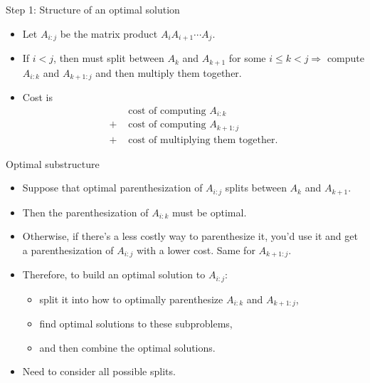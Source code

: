 \documentclass{beamer}
\begin{document}
\begin{frame}{Step 1: Structure of an optimal solution}
    \begin{itemize}
        \item Let $A_{i:j}$ be the matrix product $A_i A_{i+1} \cdots A_j$.
        \item If $i < j$, then must split between $A_k$ and $A_{k+1}$ for some $i \leq k < j \Rightarrow$  compute $A_{i:k}$ and $A_{k+1:j}$ and then multiply them together.
        \item Cost is
            \begin{equation*}
                \begin{align*}
                        & \text{ cost of computing } A_{i:k} \\
                    +   & \text{ cost of computing } A_{k+1:j} \\
                    +   & \text{ cost of multiplying them together.}
                \end{align*}
            \end{equation*}
    \end{itemize}
\end{frame}

\begin{frame}{Optimal substructure}
    \begin{itemize}
        \item Suppose that optimal parenthesization of $A_{i:j}$ splits between $A_k$ and $A_{k+1}$.
        \item Then the parenthesization of $A_{i:k}$ must be optimal.
        \item Otherwise, if there's a less costly way to parenthesize it, you'd use it and get a parenthesization of $A_{i:j}$ with a lower cost. Same for $A_{k+1:j}$.
        \item Therefore, to build an optimal solution to $A_{i:j}$:
            \begin{itemize}
                \item split it into how to optimally parenthesize $A_{i:k}$ and $A_{k+1:j}$,
                \item find optimal solutions to these subproblems,
                \item and then combine the optimal solutions.
            \end{itemize}
        \item Need to consider all possible splits.
    \end{itemize}
\end{frame}
\end{document}
